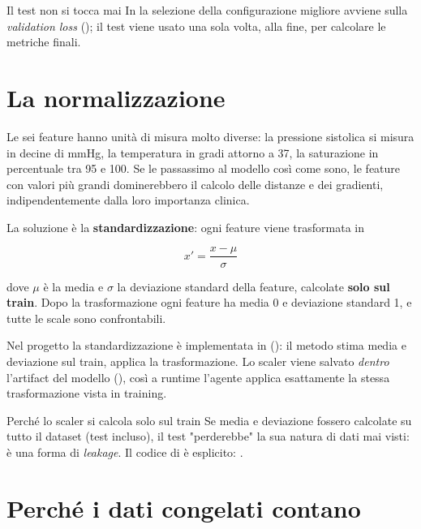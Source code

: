 \begin{esempio}{Il test non si tocca mai}
In  la selezione della configurazione migliore
avviene sulla \emph{validation loss} (); il test
viene usato una sola volta, alla fine, per calcolare le metriche finali.
\end{esempio}

\section{La normalizzazione}\label{sec:normalizzazione}

Le sei feature hanno unità di misura molto diverse: la pressione sistolica
si misura in decine di mmHg, la temperatura in gradi attorno a 37, la
saturazione in percentuale tra 95 e 100. Se le passassimo al modello così
come sono, le feature con valori più grandi dominerebbero il calcolo delle
distanze e dei gradienti, indipendentemente dalla loro importanza clinica.

La soluzione è la \textbf{standardizzazione}: ogni feature viene trasformata
in

\begin{equation}
x' = \frac{x - \mu}{\sigma}
\end{equation}

dove $\mu$ è la media e $\sigma$ la deviazione standard della feature,
calcolate \textbf{solo sul train}. Dopo la trasformazione ogni feature ha
media 0 e deviazione standard 1, e tutte le scale sono confrontabili.

Nel progetto la standardizzazione è implementata in
 ():
il metodo  stima media e deviazione sul train, 
applica la trasformazione. Lo scaler viene salvato \emph{dentro} l'artifact
del modello (), così a runtime
l'agente applica esattamente la stessa trasformazione vista in training.

\begin{esempio}{Perché lo scaler si calcola solo sul train}
Se media e deviazione fossero calcolate su tutto il dataset (test incluso),
il test "perderebbe" la sua natura di dati mai visti: è una forma di
\emph{leakage}. Il codice di  è esplicito:
.
\end{esempio}

\section{Perché i dati congelati contano}\label{sec:dati-congelati-riproducibilita}

